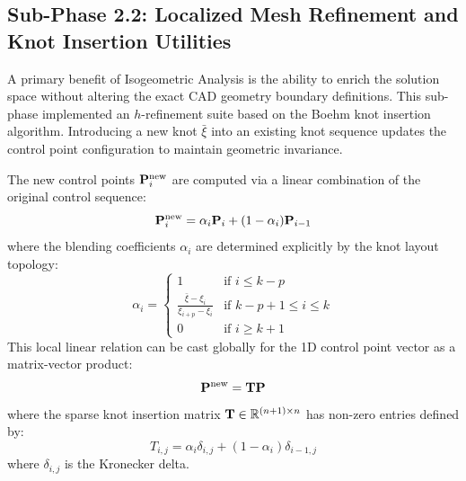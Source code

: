 \subsection{Sub-Phase 2.2: Localized Mesh Refinement and Knot Insertion Utilities}
\label{subsec:refinement_utils}

A primary benefit of Isogeometric Analysis is the ability to enrich the solution space without altering the exact CAD geometry boundary definitions. This sub-phase implemented an $h$-refinement suite based on the Boehm knot insertion algorithm. Introducing a new knot $\bar{\xi}$ into an existing knot sequence updates the control point configuration to maintain geometric invariance.

The new control points $\mathbf{P}_i^{\text{new}}$ are computed via a linear combination of the original control sequence:
\begin{equation}
        \mathbf{P}_i^{\text{new}} = \alpha_i \mathbf{P}_i + (1 - \alpha_i) \mathbf{P}_{i-1}
\end{equation}
where the blending coefficients $\alpha_i$ are determined explicitly by the knot layout topology:
\begin{equation}
        \alpha_i = \begin{cases} 
                1 & \text{if } i \le k - p \\ 
                \frac{\bar{\xi} - \xi_i}{\xi_{i+p} - \xi_i} & \text{if } k - p + 1 \le i \le k \\ 
                0 & \text{if } i \ge k + 1 
        \end{cases}
\end{equation}
This local linear relation can be cast globally for the 1D control point vector as a matrix-vector product:
\begin{equation}
        \mathbf{P}^{\text{new}} = \mathbf{T} \mathbf{P}
\end{equation}
where the sparse knot insertion matrix $\mathbf{T} \in \mathbb{R}^{(n+1) \times n}$ has non-zero entries defined by:
\begin{equation}
        T_{i, j} = \alpha_i \delta_{i, j} + (1 - \alpha_i) \delta_{i-1, j}
\end{equation}
where $\delta_{i, j}$ is the Kronecker delta.

